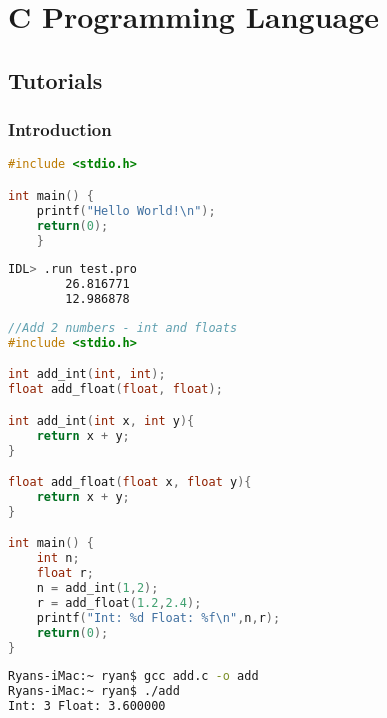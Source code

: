 \documentclass[crop=false,class=book]{standalone}
\begin{document}
\chapter{C Programming Language}
\section{Tutorials}
\subsection{Introduction}
\begin{minipage}[t]{.48\textwidth}
\centering
\begin{lstlisting}[language=C,basicstyle=\small\ttfamily,frame=single,caption=test.pro]
#include <stdio.h>

int main() {
	printf("Hello World!\n");
	return(0);
	}
\end{lstlisting}
\end{minipage}\hfill
\begin{minipage}[t]{.48\textwidth}
\centering
\begin{lstlisting}[language=bash,basicstyle=\small\ttfamily,frame=single,caption=output]
IDL> .run test.pro
        26.816771
        12.986878
\end{lstlisting}
\end{minipage}
\begin{minipage}[t]{.48\textwidth}
\centering
\begin{lstlisting}[language=C,basicstyle=\small\ttfamily,frame=single,caption=add.c]
//Add 2 numbers - int and floats
#include <stdio.h>

int add_int(int, int);
float add_float(float, float);

int add_int(int x, int y){
    return x + y;
}

float add_float(float x, float y){
    return x + y;
}

int main() {
    int n;
    float r;
    n = add_int(1,2);
    r = add_float(1.2,2.4);
    printf("Int: %d Float: %f\n",n,r);
    return(0);
}
\end{lstlisting}
\end{minipage}\hfill
\begin{minipage}[t]{.48\textwidth}
\centering
\begin{lstlisting}[language=bash,basicstyle=\small\ttfamily,frame=single,caption=output]
Ryans-iMac:~ ryan$ gcc add.c -o add
Ryans-iMac:~ ryan$ ./add
Int: 3 Float: 3.600000
\end{lstlisting}
\end{minipage}
\end{document}

